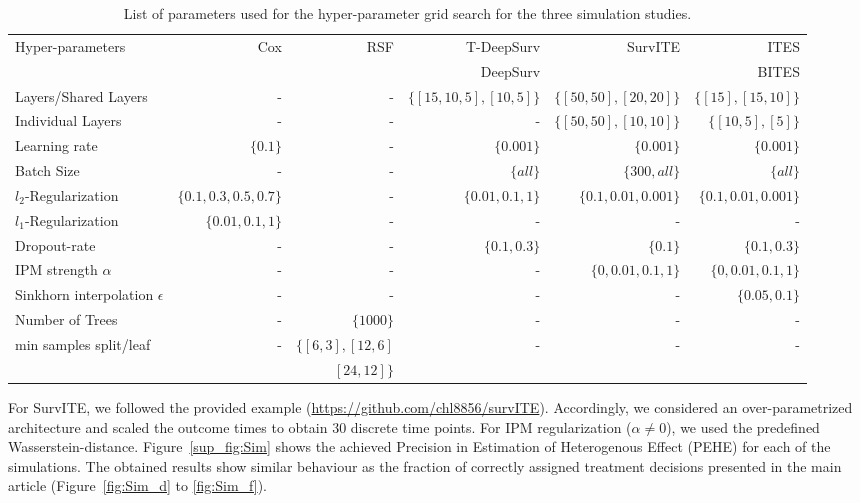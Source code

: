 \documentclass{article}
\begin{document}
	\begin{table}[!h]
		\caption{List of parameters used for the hyper-parameter grid search for the three simulation studies.}
		\label{Tab:hyperparameters}
		\vskip 0.15in
		\begin{center}
			\begin{small}
				\begin{sc}
					\begin{tabular}{l|rrrrr}
						\toprule
						Hyper-parameters &    Cox & RSF & T-DeepSurv &SurvITE &  ITES   \\
						&&& DeepSurv && BITES \\
						\midrule
						Layers/Shared Layers &-&        - & $\{[15,10,5],[10,5]\}$ &$\{[50,50],[20,20]\}$& $\{[15],[15,10]\}$   \\
						Individual Layers   &-& 	-& -&$\{[50,50],[10,10]\}$& $\{[10,5],[5]\}$ \\
						Learning rate &$\{0.1\}$& -&$\{0.001\}$&$\{0.001\}$&$\{0.001\}$\\
						Batch Size &-&-& $\{all\}$&$\{300, all\}$&$\{all\}$\\
						$l_2$-Regularization &$\{0.1, 0.3, 0.5, 0.7\}$& - &$\{0.01,0.1,1\}$ &$\{0.1,0.01,0.001\}$&$\{0.1,0.01,0.001\}$\\
						$l_1$-Regularization &$\{0.01,0.1,1\}$&-&-&-&-\\
						Dropout-rate &-& -&$\{0.1,0.3\}$&$\{0.1\}$&$\{0.1,0.3\}$\\
						IPM strength $\alpha$&-&-&-&$\{0,0.01, 0.1, 1\}$&$\{0,0.01, 0.1, 1\}$\\
						Sinkhorn interpolation $\epsilon$ &-&-&-&-&$\{0.05, 0.1\}$ \\
						Number of Trees& -&$\{1000\}$&-&-&-\\
						min samples split/leaf& -&$\{[6,3],[12,6]$&-&-&-\\
						& &$[24,12]\}$&&&\\
						\bottomrule
					\end{tabular}
				\end{sc}
			\end{small}
		\end{center}
		\vskip -0.1in
	\end{table}
	
	For SurvITE, we followed the provided example (\url{https://github.com/chl8856/survITE}). Accordingly, we considered an over-parametrized architecture and scaled the outcome times to obtain $30$ discrete time points. For IPM regularization ($\alpha\neq0$), we used the predefined Wasserstein-distance.
	Figure~\ref{sup_fig:Sim} shows the achieved Precision in Estimation of Heterogenous Effect (PEHE) for each of the simulations. The obtained results show similar behaviour as the fraction of correctly assigned treatment decisions presented in the main article (Figure~\ref{fig:Sim_d} to \ref{fig:Sim_f}).
	
\end{document}
